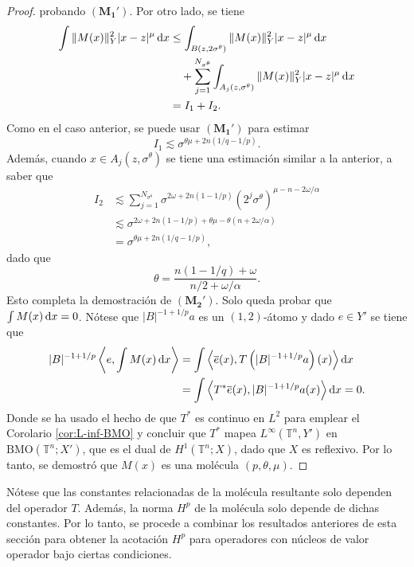 \begin{proof}
	probando $(\mathbf{M_1'})$. Por otro lado, se tiene
	\begin{align*}
		\int \|M(x)\|_Y^2|x-z|^\mu \mathop{}\!\mathrm{d} x &\leq 
		\int_{B(z, 2\sigma^\theta)} \|M(x)\|_Y^2|x-z|^\mu \mathop{}\!\mathrm{d} x\\
		&  \quad + \sum_{j=1}^{N_{\sigma^\theta}} \int_{A_j(z, \sigma^\theta)} \|M(x)\|_Y^2|x-z|^\mu \mathop{}\!\mathrm{d} x \\
		 & = I_1 + I_2.
	\end{align*}
	Como en el caso anterior, se puede usar $(\mathbf{M_1'})$ para estimar 
	\begin{equation*}
		I_1 \lesssim \sigma^{\theta\mu + 2n(1/q - 1/p)}.
	\end{equation*}
	Además, cuando $x \in A_j(z, \sigma^\theta)$ se tiene una estimación similar a la anterior, a saber que
	\begin{align*}
		I_2  & \lesssim \sum_{j=1}^{N_{\sigma^\theta}} \sigma^{2\omega + 2n(1 - 1/p) } (2^j\sigma^\theta)^{\mu - n - 2\omega/\alpha} \\
		 &\lesssim \sigma^{ 2\omega + 2n(1-1/p) + \theta\mu -\theta(n + 2\omega/\alpha) } \\
		 & =\sigma^{ \theta\mu + 2n(1/q - 1/p) },
	\end{align*}
	dado que 
	\begin{equation*}
		\theta = \frac{n(1-1/q)+\omega}{ n/2 + \omega/\alpha }.
	\end{equation*}
	Esto completa la demostración de $(\mathbf{M_2'})$. Solo queda probar que $\int M(x)\mathop{}\!\mathrm{d} x=0$. Nótese que $|B|^{-1+1/p}a$  es un $(1, 2)$-átomo y dado $e \in Y'$ se tiene que
	\begin{align*}
		|B|^{-1+1/p}\left\langle e, \int M(x)\mathop{}\!\mathrm{d} x \right\rangle & = \int \left\langle \overline{e}(x) , T\left(  |B|^{-1+1/p}a\right)(x)\right\rangle \mathop{}\!\mathrm{d} x \\
		 &= \int \left\langle T^*\overline{e}(x) ,   |B|^{-1+1/p}a(x)\right\rangle \mathop{}\!\mathrm{d} x = 0.
	\end{align*}
	Donde se ha usado el hecho de que $T^*$ es continuo en $L^2$ para emplear el Corolario \ref{cor:L-inf-BMO} y concluir que $T^*$ mapea $L^\infty(\mathbb{T}^n, Y')$ en $\mathrm{BMO}(\mathbb{T}^n; X')$, que es el dual de $H^1(\mathbb{T}^n;X)$, dado que $X$ es reflexivo. Por lo tanto, se demostró que $M(x)$ es una molécula $(p, \theta,\mu)$.
\end{proof}
Nótese que las constantes relacionadas de la molécula resultante solo dependen del operador $T$. Además, la norma $H^p$ de la molécula solo depende de dichas constantes. Por lo tanto, se procede a combinar los resultados anteriores de esta sección para obtener la acotación $H^p$ para operadores con núcleos de valor operador bajo ciertas condiciones. 
